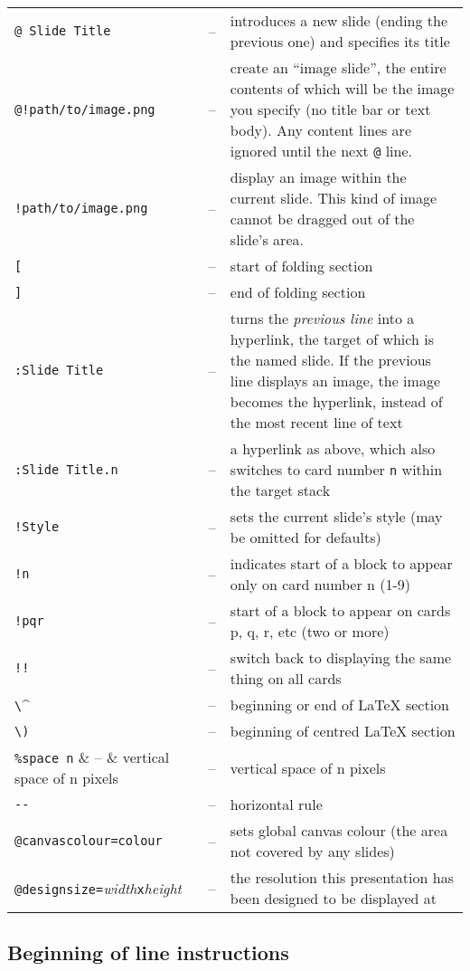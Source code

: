\documentclass[12pt,a4paper,twoside]{article}
\renewcommand{\_}{\texttt{\symbol{95}}}
\begin{document}
\begin{tabular}{llp{11cm}}
\verb^@ Slide Title^ & -- & introduces a new slide (ending the previous one)
	and specifies its title\\
\verb^@!path/to/image.png^ & -- & create an ``image slide'', the entire
	contents of which will be the image you specify (no title bar or text
	body). Any content lines are ignored until the next \verb^@^ line.\\
\verb^!path/to/image.png^ & -- & display an image within the current slide.
	This kind of image cannot be dragged out of the slide's area.\\
\verb^[^             & -- & start of folding section\\
\verb^]^             & -- & end of folding section\\
\verb^:Slide Title^  & -- & turns the \textit{previous line} into a hyperlink,
	the target of which is the named slide. If the previous line displays
	an image, the image becomes the hyperlink, instead of the most recent
	line of text\\
\verb^:Slide Title.n^  & -- & a hyperlink as above, which also switches to
	card number \verb^n^ within the target stack\\
\verb^!Style^        & -- & sets the current slide's style (may be omitted for defaults)\\
\verb^!n^   & -- & indicates start of a block to appear only on card number n (1-9)\\
\verb^!pqr^ & -- & start of a block to appear on cards p, q, r, etc (two or more)\\
\verb^!!^   & -- & switch back to displaying the same thing on all cards\\
\verb^\^    & -- & beginning or end of LaTeX section\\
\verb^\)^   & -- & beginning of centred LaTeX section\\
\verb^%space n^      & -- & vertical space of n pixels\\
\verb^--^   & -- & horizontal rule\\
\verb^@canvascolour=colour^ & -- & sets global canvas colour
	(the area not covered by any slides)\\
\verb^@designsize=^\textit{width}\verb^x^\textit{height} & -- & the resolution this presentation has
	been designed to be displayed at\\
\end{tabular}

\subsection*{Beginning of line instructions}
\end{document}
